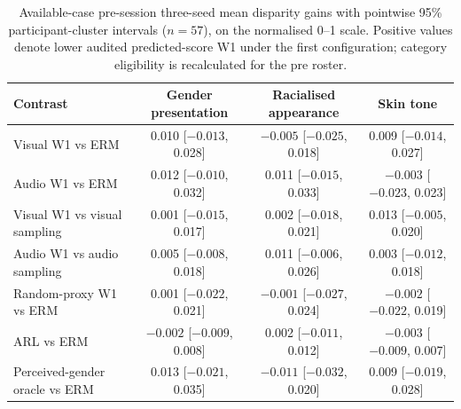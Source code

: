 \begin{table}[htbp]
\centering
\caption{Available-case pre-session three-seed mean disparity gains with pointwise 95\%
participant-cluster intervals ($n=57$), on the normalised 0--1 scale. Positive values denote lower
audited predicted-score W1 under the first configuration; category eligibility is recalculated
for the pre roster.}
\label{tab:stage-c-pre-disparity-contrasts}
\small
\begin{adjustbox}{max width=\textwidth}
\begin{tabular}{lccc}
\toprule
Contrast & Gender presentation & Racialised appearance & Skin tone \\
\midrule
Visual W1 vs ERM & \shortstack{0.010\\{[$-0.013$, 0.028]}} & \shortstack{$-0.005$\\{[$-0.025$, 0.018]}} & \shortstack{0.009\\{[$-0.014$, 0.027]}} \\
Audio W1 vs ERM & \shortstack{0.012\\{[$-0.010$, 0.032]}} & \shortstack{0.011\\{[$-0.015$, 0.033]}} & \shortstack{$-0.003$\\{[$-0.023$, 0.023]}} \\
Visual W1 vs visual sampling & \shortstack{0.001\\{[$-0.015$, 0.017]}} & \shortstack{0.002\\{[$-0.018$, 0.021]}} & \shortstack{0.013\\{[$-0.005$, 0.020]}} \\
Audio W1 vs audio sampling & \shortstack{0.005\\{[$-0.008$, 0.018]}} & \shortstack{0.011\\{[$-0.006$, 0.026]}} & \shortstack{0.003\\{[$-0.012$, 0.018]}} \\
Random-proxy W1 vs ERM & \shortstack{0.001\\{[$-0.022$, 0.021]}} & \shortstack{$-0.001$\\{[$-0.027$, 0.024]}} & \shortstack{$-0.002$\\{[$-0.022$, 0.019]}} \\
ARL vs ERM & \shortstack{$-0.002$\\{[$-0.009$, 0.008]}} & \shortstack{0.002\\{[$-0.011$, 0.012]}} & \shortstack{$-0.003$\\{[$-0.009$, 0.007]}} \\
Perceived-gender oracle vs ERM & \shortstack{0.013\\{[$-0.021$, 0.035]}} & \shortstack{$-0.011$\\{[$-0.032$, 0.020]}} & \shortstack{0.009\\{[$-0.019$, 0.028]}} \\
\bottomrule
\end{tabular}
\end{adjustbox}
\end{table}
\FloatBarrier


